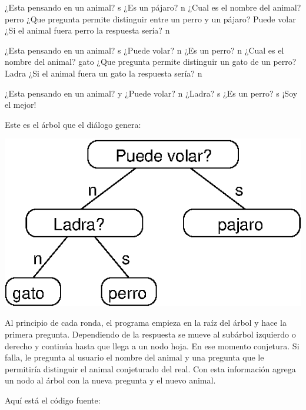 \beforeverb 
\begin{pythoncode}
¿Esta pensando en un animal? s
¿Es un pájaro? n
¿Cual es el nombre del animal? perro
¿Que pregunta permite distinguir entre un perro 
y un pájaro? Puede volar
¿Si el animal fuera perro la respuesta sería? n

¿Esta pensando en un animal? s
¿Puede volar? n
¿Es un perro? n
¿Cual es el nombre del animal? gato
¿Que pregunta permite distinguir un gato 
de un perro? Ladra
¿Si el animal fuera un gato 
la respuesta sería? n

¿Esta pensando en un animal? y
¿Puede volar? n
¿Ladra? s
¿Es un perro? s
¡Soy el mejor!

\end{pythoncode}
\afterverb Este es el árbol que el diálogo genera:

\beforefig \centerline{\includegraphics{illustrations/tree5}}
\afterfig

Al principio de cada ronda, el programa empieza en la raíz del árbol
y hace la primera pregunta. Dependiendo de la respuesta se mueve al
subárbol izquierdo o derecho y continúa hasta que llega a un nodo
hoja. En ese momento conjetura. Si falla, le pregunta al usuario el
nombre del animal y una pregunta que le permitiría distinguir el animal
conjeturado del real. Con esta información agrega un nodo al árbol
con la nueva pregunta y el nuevo animal.

Aquí está el código fuente:


